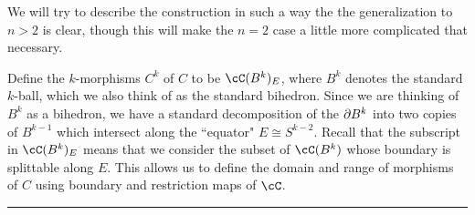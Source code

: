 We will try to describe the construction in such a way the the generalization to $n>2$ is clear,
though this will make the $n=2$ case a little more complicated that necessary.

Define the $k$-morphisms $C^k$ of $C$ to be $\cC(B^k)_E$, where $B^k$ denotes the standard
$k$-ball, which we also think of as the standard bihedron.
Since we are thinking of $B^k$ as a bihedron, we have a standard decomposition of the $\partial B^k$
into two copies of $B^{k-1}$ which intersect along the ``equator" $E \cong S^{k-2}$.
Recall that the subscript in $\cC(B^k)_E$ means that we consider the subset of $\cC(B^k)$
whose boundary is splittable along $E$.
This allows us to define the domain and range of morphisms of $C$ using
boundary and restriction maps of $\cC$.


\medskip
\hrule
\medskip

\medskip

